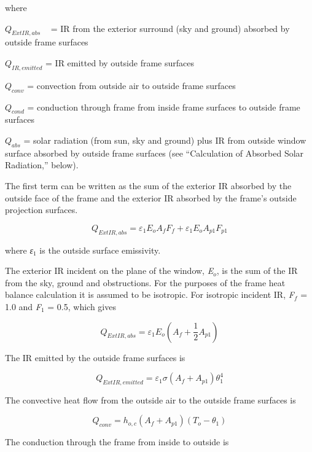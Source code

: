 where

\({Q_{ExtIR,abs}}\) ~ = IR from the exterior surround (sky and ground) absorbed by outside frame surfaces

\({Q_{IR,emitted}}\) = IR emitted by outside frame surfaces

\({Q_{conv}}\) = convection from outside air to outside frame surfaces

\({Q_{cond}}\) = conduction through frame from inside frame surfaces to outside frame surfaces

\({Q_{abs}}\) = solar radiation (from sun, sky and ground) plus IR from outside window surface absorbed by outside frame surfaces (see ``Calculation of Absorbed Solar Radiation,'' below).

The first term can be written as the sum of the exterior IR absorbed by the outside face of the frame and the exterior IR absorbed by the frame's outside projection surfaces.

\begin{equation}
{Q_{ExtIR,abs}} = {\varepsilon_1}{E_o}{A_f}{F_f} + {\varepsilon_1}{E_o}{A_{p1}}{F_{p1}}
\end{equation}

where \emph{ε\(_{1}\)} is the outside surface emissivity.

The exterior IR incident on the plane of the window, \emph{E\(_{o}\)}, is the sum of the IR from the sky, ground and obstructions. For the purposes of the frame heat balance calculation it is assumed to be isotropic. For isotropic incident IR, \emph{F\(_{f}\)} = 1.0 and \emph{F\(_{1}\)} = 0.5, which gives

\begin{equation}
{Q_{ExtIR,abs}} = {\varepsilon_1}{E_o}({A_f} + \frac{1}{2}{A_{p1}})
\end{equation}

The IR emitted by the outside frame surfaces is

\begin{equation}
{Q_{ExtIR,emitted}} = {\varepsilon_1}\sigma ({A_f} + {A_{p1}})\theta_1^4
\end{equation}

The convective heat flow from the outside air to the outside frame surfaces is

\begin{equation}
{Q_{conv}} = {h_{o,c}}({A_f} + {A_{p1}})({T_o} - {\theta_1})
\end{equation}

The conduction through the frame from inside to outside is

